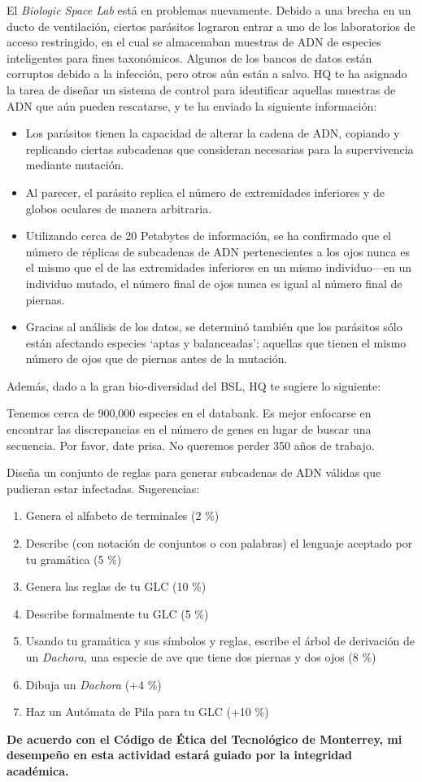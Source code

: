 \documentclass{article}
\begin{document}
El \textit{Biologic Space Lab} está en problemas nuevamente.
Debido a una brecha en un ducto de ventilación, ciertos parásitos lograron entrar a uno de los laboratorios de acceso restringido, en el cual se almacenaban muestras de ADN de especies inteligentes para fines taxonómicos.
Algunos de los bancos de datos están corruptos debido a la infección, pero otros aún están a salvo.
HQ te ha asignado la tarea de diseñar un sistema de control para identificar aquellas muestras de ADN que aún pueden rescatarse, y te ha enviado la siguiente información:

\begin{itemize}
    \itemsep0em
    \item Los parásitos tienen la capacidad de alterar la cadena de ADN, copiando y replicando ciertas subcadenas que consideran necesarias para la supervivencia mediante mutación.
    \item Al parecer, el parásito replica el número de extremidades inferiores y de globos oculares de manera arbitraria.
    \item Utilizando cerca de 20 Petabytes de información, se ha confirmado que el número de réplicas de subcadenas de ADN pertenecientes a los ojos nunca es el mismo que el de las extremidades inferiores en un mismo individuo---en un individuo mutado, el número final de ojos nunca es igual al número final de piernas.
    \item Gracias al análisis de los datos, se determinó también que los parásitos sólo están afectando especies `aptas y balanceadas'; aquellas que tienen el mismo número de ojos que de piernas antes de la mutación.
\end{itemize}

Además, dado a la gran bio-diversidad del BSL, HQ te sugiere lo siguiente:

\begin{tcolorbox}
{\small Tenemos cerca de 900,000 especies en el databank.
Es mejor enfocarse en encontrar las discrepancias en el número de genes en lugar de buscar una secuencia.
Por favor, date prisa. No queremos perder 350 años de trabajo.}
\end{tcolorbox}

Diseña un conjunto de reglas para generar subcadenas de ADN válidas que pudieran estar infectadas. Sugerencias:

\begin{enumerate}[label=\tt \alph*)]
    \item Genera el alfabeto de terminales (2 \%)
    \item Describe (con notación de conjuntos o con palabras) el lenguaje aceptado por tu gramática (5 \%)
    \item Genera las reglas de tu GLC (10 \%)
    \item Describe formalmente tu GLC (5 \%)
    \item Usando tu gramática y sus símbolos y reglas, escribe el árbol de derivación de un \textit{Dachora}, una especie de ave que tiene dos piernas y dos ojos (8 \%)
    \item Dibuja un \textit{Dachora} (+4 \%)
    \item Haz un Autómata de Pila para tu GLC (+10 \%)
\end{enumerate}

\vfill

\textbf{De acuerdo con el Código de Ética del Tecnológico de Monterrey, mi desempeño en esta actividad estará guiado por la integridad académica.}
\end{document}
